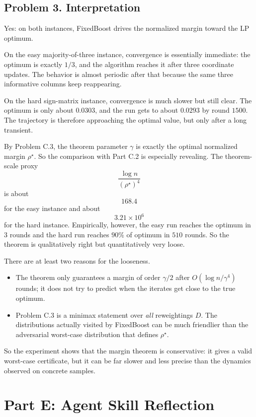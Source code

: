 \documentclass{article}
\begin{document}
\subsection{Problem 3. Interpretation}

Yes: on both instances, FixedBoost drives the normalized margin toward the LP optimum.

On the easy majority-of-three instance, convergence is essentially immediate: the optimum is exactly $1/3$, and the algorithm reaches it after three coordinate updates. The behavior is almost periodic after that because the same three informative columns keep reappearing.

On the hard sign-matrix instance, convergence is much slower but still clear. The optimum is only about $0.0303$, and the run gets to about $0.0293$ by round $1500$. The trajectory is therefore approaching the optimal value, but only after a long transient.

By Problem C.3, the theorem parameter $\gamma$ is exactly the optimal normalized margin $\rho^\star$. So the comparison with Part C.2 is especially revealing. The theorem-scale proxy
$$
\frac{\log n}{(\rho^\star)^4}
$$
is about
$$
168.4
$$
for the easy instance and about
$$
3.21\times 10^6
$$
for the hard instance. Empirically, however, the easy run reaches the optimum in $3$ rounds and the hard run reaches $90\%$ of optimum in $510$ rounds. So the theorem is qualitatively right but quantitatively very loose.

There are at least two reasons for the looseness.
\begin{itemize}
\item The theorem only guarantees a margin of order $\gamma/2$ after $O(\log n/\gamma^4)$ rounds; it does not try to predict when the iterates get close to the true optimum.
\item Problem C.3 is a minimax statement over \emph{all} reweightings $D$. The distributions actually visited by FixedBoost can be much friendlier than the adversarial worst-case distribution that defines $\rho^\star$.
\end{itemize}
So the experiment shows that the margin theorem is conservative: it gives a valid worst-case certificate, but it can be far slower and less precise than the dynamics observed on concrete samples.

\newpage
\section{Part E: Agent Skill Reflection}
\end{document}
